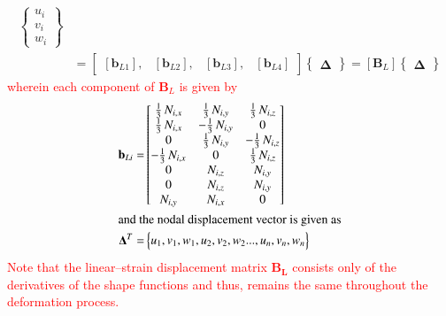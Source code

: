 \begin{equation}
\begin{aligned}
\begin{Bmatrix}
u_{i} \\
v_{i} \\
w_{i} \end{Bmatrix} \\
& = \begin{bmatrix}
[\mathbf{b}_{L1}], & [\mathbf{b}_{L2}], & [\mathbf{b}_{L3}], & [\mathbf{b}_{L4}]
\end{bmatrix}  \begin{Bmatrix} \boldsymbol{\Delta} \end{Bmatrix}  
= [\mathbf{B}_L] \begin{Bmatrix} \boldsymbol{\Delta} \end{Bmatrix} 
\end{aligned}
\end{equation}
\textcolor{red}{wherein each component of $\mathbf{B}_L$ is given by} 
\begin{subequations}
	\begin{align}
	\mathbf{b}_{Li} = & \begin{bmatrix}
	\tfrac{1}{3} \,  N_{i,x}  & \tfrac{1}{3} \,  N_{i,y} & \tfrac{1}{3} \,  N_{i,z} \\
	\tfrac{1}{3} \,  N_{i,x}  & -\tfrac{1}{3} \,  N_{i,y} & 0 \\ 0 & \tfrac{1}{3} \, N_{i,y}  & - \tfrac{1}{3} \,  N_{i,z} \\ - \tfrac{1}{3} \,  N_{i,x}  & 0 & \tfrac{1}{3} \,  N_{i,z} \\ 0 &  N_{i,z}  &  N_{i,y} \\ 0 & N_{i,z}  &   N_{i,y} \\  N_{i,y}  &   N_{i,x} & 0 \end{bmatrix}  \\
	\intertext{and the nodal displacement vector is given as}
	\mathbf{\Delta}^T  = &
	\begin{Bmatrix}
	u_1, v_1, w_1, u_2, v_2, w_2 ...,u_n, v_n, w_n
	\end{Bmatrix}
	\end{align}
\end{subequations}
\textcolor{red}{Note that the linear--strain displacement matrix $\mathbf{B_L}$ consists only of the derivatives of the shape functions and thus, remains the same throughout the deformation process.}

